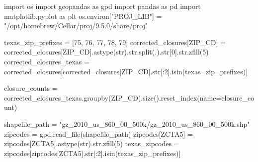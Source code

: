\documentclass[
  letterpaper,
  DIV=11,
  numbers=noendperiod]{scrartcl}
\newenvironment{Shaded}{\begin{snugshade}}{\end{snugshade}}
\newcommand{\BuiltInTok}[1]{\textcolor[rgb]{0.00,0.23,0.31}{#1}}
\newcommand{\DecValTok}[1]{\textcolor[rgb]{0.68,0.00,0.00}{#1}}
\newcommand{\ImportTok}[1]{\textcolor[rgb]{0.00,0.46,0.62}{#1}}
\newcommand{\NormalTok}[1]{\textcolor[rgb]{0.00,0.23,0.31}{#1}}
\newcommand{\OperatorTok}[1]{\textcolor[rgb]{0.37,0.37,0.37}{#1}}
\newcommand{\StringTok}[1]{\textcolor[rgb]{0.13,0.47,0.30}{#1}}
\begin{document}
\begin{Shaded}
\begin{Highlighting}[]
\ImportTok{import}\NormalTok{ os}
\ImportTok{import}\NormalTok{ geopandas }\ImportTok{as}\NormalTok{ gpd}
\ImportTok{import}\NormalTok{ pandas }\ImportTok{as}\NormalTok{ pd}
\ImportTok{import}\NormalTok{ matplotlib.pyplot }\ImportTok{as}\NormalTok{ plt}
\NormalTok{os.environ[}\StringTok{"PROJ\_LIB"}\NormalTok{] }\OperatorTok{=} \StringTok{"/opt/homebrew/Cellar/proj/9.5.0/share/proj"}

\NormalTok{texas\_zip\_prefixes }\OperatorTok{=}\NormalTok{ [}\StringTok{\textquotesingle{}75\textquotesingle{}}\NormalTok{, }\StringTok{\textquotesingle{}76\textquotesingle{}}\NormalTok{, }\StringTok{\textquotesingle{}77\textquotesingle{}}\NormalTok{, }\StringTok{\textquotesingle{}78\textquotesingle{}}\NormalTok{, }\StringTok{\textquotesingle{}79\textquotesingle{}}\NormalTok{]}
\NormalTok{corrected\_closures[}\StringTok{\textquotesingle{}ZIP\_CD\textquotesingle{}}\NormalTok{] }\OperatorTok{=}\NormalTok{ corrected\_closures[}\StringTok{\textquotesingle{}ZIP\_CD\textquotesingle{}}\NormalTok{].astype(}\BuiltInTok{str}\NormalTok{).}\BuiltInTok{str}\NormalTok{.split(}\StringTok{\textquotesingle{}.\textquotesingle{}}\NormalTok{).}\BuiltInTok{str}\NormalTok{[}\DecValTok{0}\NormalTok{].}\BuiltInTok{str}\NormalTok{.zfill(}\DecValTok{5}\NormalTok{)}
\NormalTok{corrected\_closures\_texas }\OperatorTok{=}\NormalTok{ corrected\_closures[corrected\_closures[}\StringTok{\textquotesingle{}ZIP\_CD\textquotesingle{}}\NormalTok{].}\BuiltInTok{str}\NormalTok{[:}\DecValTok{2}\NormalTok{].isin(texas\_zip\_prefixes)]}

\NormalTok{closure\_counts }\OperatorTok{=}\NormalTok{ corrected\_closures\_texas.groupby(}\StringTok{\textquotesingle{}ZIP\_CD\textquotesingle{}}\NormalTok{).size().reset\_index(name}\OperatorTok{=}\StringTok{\textquotesingle{}closure\_count\textquotesingle{}}\NormalTok{)}

\NormalTok{shapefile\_path }\OperatorTok{=} \StringTok{"gz\_2010\_us\_860\_00\_500k/gz\_2010\_us\_860\_00\_500k.shp"}
\NormalTok{zipcodes }\OperatorTok{=}\NormalTok{ gpd.read\_file(shapefile\_path)}
\NormalTok{zipcodes[}\StringTok{\textquotesingle{}ZCTA5\textquotesingle{}}\NormalTok{] }\OperatorTok{=}\NormalTok{ zipcodes[}\StringTok{\textquotesingle{}ZCTA5\textquotesingle{}}\NormalTok{].astype(}\BuiltInTok{str}\NormalTok{).}\BuiltInTok{str}\NormalTok{.zfill(}\DecValTok{5}\NormalTok{)}
\NormalTok{texas\_zipcodes }\OperatorTok{=}\NormalTok{ zipcodes[zipcodes[}\StringTok{\textquotesingle{}ZCTA5\textquotesingle{}}\NormalTok{].}\BuiltInTok{str}\NormalTok{[:}\DecValTok{2}\NormalTok{].isin(texas\_zip\_prefixes)]}


\end{Highlighting}
\end{Shaded}
\end{document}
